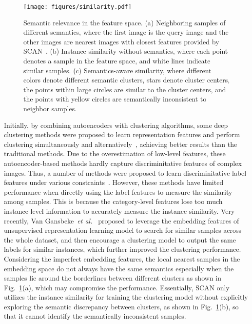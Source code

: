 \documentclass[journal]{IEEEtran}
\newcommand{\etal}{\emph{et al.}\xspace}
\begin{document}
\begin{figure}[bt!]
    \centering
    \texttt{[image: figures/similarity.pdf]}
    \caption{Semantic relevance in the feature space. (a) Neighboring samples of different semantics, where the first image is the query image and the other images are nearest images with closest features provided by SCAN~\cite{scan}. (b) Instance similarity without semantics, where each point denotes a sample in the feature space, and white lines indicate similar samples. (c) Semantics-aware similarity, where different colors denote different semantic clusters, stars denote cluster centers, the points within large circles are similar to the cluster centers, and the points with yellow circles are semantically inconsistent to neighbor samples.  }
    \label{fig_general}
\end{figure}

Initially, by combining autoencoders with clustering algorithms, some deep clustering methods were proposed to learn representation features and perform clustering simultaneously and alternatively~\cite{Xie2016, LI2018161, DCN2016, DeepCluster2017, Zhang_2019_CVPR, DEPICT2017, VaDE2017, GMVAE, DASC2018}, achieving better results than the traditional methods. Due to the overestimation of low-level features, these autoencoder-based methods hardly capture discriminitative features of complex images. Thus, a number of methods were proposed to learn discriminitative label features under various constraints~\cite{DAIC2017,IIC2019,Wu_2019_ICCV,gatcluster,gatcluster, cc, idfd}. However, these methods have limited performance when directly using the label features to measure the similarity among samples. This is because the category-level features lose too much instance-level information to accurately measure the instance similarity.
Very recently, Van Gansbeke~\etal~\cite{scan} proposed to leverage the embedding features of unsupervised representation learning model to search for similar samples across the whole dataset, and then encourage a clustering model to output the same labels for similar instances, which further improved the clustering performance.
Considering the imperfect embedding features, the local nearest samples in the embedding space do not always have the same semantics especially when the samples lie around the borderlines between different clusters as shown in Fig.~\ref{fig_general}(a), which may compromise the performance.
Essentially, SCAN only utilizes the instance similarity for training the clustering model without explicitly exploring the semantic discrepancy between clusters, as shown in Fig.~\ref{fig_general}(b), so that it cannot identify the semantically inconsistent samples.
\end{document}
